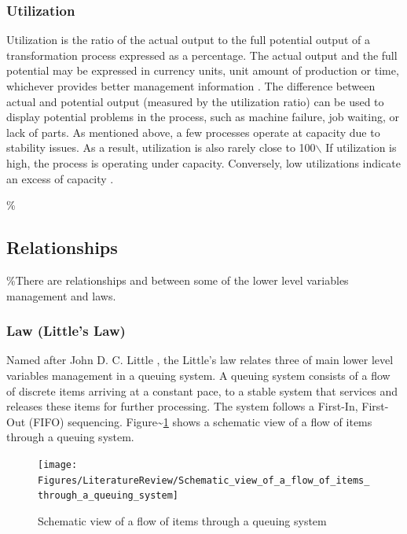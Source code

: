 \documentclass{article}
\begin{document}
\subsubsection{Utilization}
\label{sec:org8c09864}

Utilization is the ratio of the actual output to the full potential output of a transformation process expressed as a percentage.
The actual output and the full potential may be expressed in currency units, unit amount of production or time, whichever provides better management information \citep[pp.57-58]{Kumar2009}.
The difference between actual and potential output (measured by the utilization ratio) can be used to display potential problems in the process, such as machine failure, job waiting, or lack of parts.
As mentioned above, a few processes operate at capacity due to stability issues.
As a result, utilization is also rarely close to 100$\backslash$%
If utilization is high, the process is operating under capacity.
Conversely, low utilizations indicate an excess of capacity \citep{Hopp2001}.

\%\subsection{Relationships}

\%There are relationships and between some of the lower level variables management and laws.

\subsubsection{Law (Little's Law)}
\label{sec:org9359f64}

Named after John D. C. Little \citep{Little1961}, the Little's law relates three of main lower level variables management in a queuing system.
A queuing system consists of a flow of discrete items arriving at a constant pace, to a stable system that services and releases these items for further processing.
The system follows a First-In, First-Out (FIFO) sequencing.
Figure\textasciitilde{}\ref{fig:Schematic view of a flow of items through a queuing system} shows a schematic view of a flow of items through a queuing system.

\begin{figure}[H]
  \centering
  \texttt{[image: Figures/LiteratureReview/Schematic\_view\_of\_a\_flow\_of\_items\_through\_a\_queuing\_system]}
  \caption{Schematic view of a flow of items through a queuing system}\label{fig:Schematic view of a flow of items through a queuing system}
\end{figure}
\end{document}
